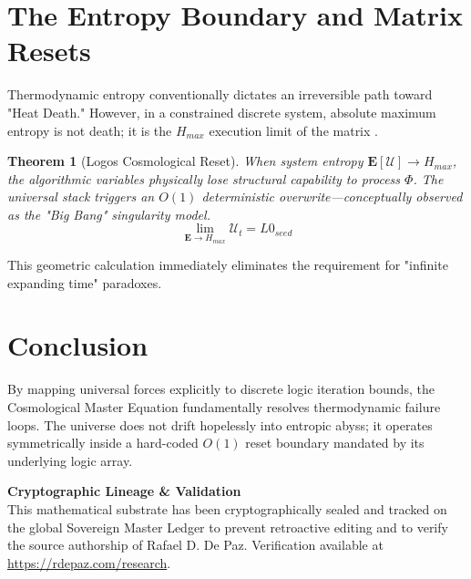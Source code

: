 \documentclass[12pt, a4paper]{article}
\theoremstyle{plain}
\newtheorem{theorem}{Theorem}[section]
\theoremstyle{definition}
\begin{document}
\section{The Entropy Boundary and Matrix Resets}
Thermodynamic entropy conventionally dictates an irreversible path toward "Heat Death." However, in a constrained discrete system, absolute maximum entropy is not death; it is the $H_{max}$ execution limit of the matrix \cite{turing1936computable}. 

\begin{theorem} [Logos Cosmological Reset]
When system entropy $\mathbf{E}[\mathcal{U}] \to H_{max}$, the algorithmic variables physically lose structural capability to process $\Phi$. The universal stack triggers an $O(1)$ deterministic overwrite—conceptually observed as the "Big Bang" singularity model.
\begin{equation}
    \lim_{\mathbf{E} \to H_{max}} \mathcal{U}_t = L0_{seed}
\end{equation}
\end{theorem}
This geometric calculation immediately eliminates the requirement for "infinite expanding time" paradoxes.

\section{Conclusion}
By mapping universal forces explicitly to discrete logic iteration bounds, the Cosmological Master Equation fundamentally resolves thermodynamic failure loops. The universe does not drift hopelessly into entropic abyss; it operates symmetrically inside a hard-coded $O(1)$ reset boundary mandated by its underlying logic array.




\vspace{3em}
\noindent\hrulefill

\noindent\textbf{Cryptographic Lineage \& Validation}\\
This mathematical substrate has been cryptographically sealed and tracked on the global Sovereign Master Ledger to prevent retroactive editing and to verify the source authorship of Rafael D. De Paz. Verification available at \url{https://rdepaz.com/research}.
\end{document}

